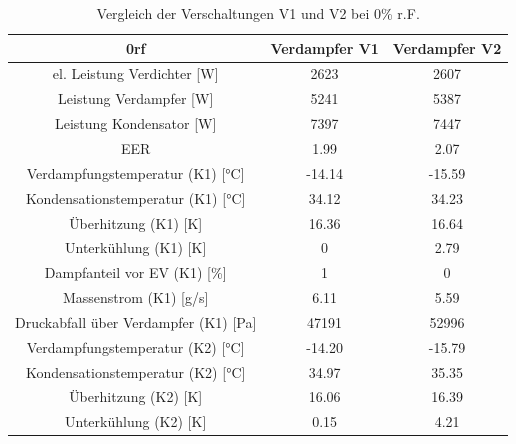 \begin{table}[h!]
\centering
\caption{Vergleich der Verschaltungen V1 und V2 bei 0\% r.F.}
\label{tab:VergleichV1V2_0rF}
\begin{tabular}{|ccc|}
\hline

0rf                                                             & Verdampfer V1               & Verdampfer V2 \\ \hline
\multicolumn{1}{|c|}{el. Leistung Verdichter {[}W{]}}           & \multicolumn{1}{c|}{2623}   & 2607          \\
\multicolumn{1}{|c|}{Leistung Verdampfer {[}W{]}}               & \multicolumn{1}{c|}{5241}   & 5387          \\
\multicolumn{1}{|c|}{Leistung Kondensator {[}W{]}}             & \multicolumn{1}{c|}{7397}   & 7447          \\
\multicolumn{1}{|c|}{EER}                                       & \multicolumn{1}{c|}{1.99}   & 2.07          \\ \hline
\multicolumn{1}{|c|}{Verdampfungstemperatur (K1) {[}°C{]}}      & \multicolumn{1}{c|}{-14.14} & -15.59        \\
\multicolumn{1}{|c|}{Kondensationstemperatur (K1) {[}°C{]}}    & \multicolumn{1}{c|}{34.12}  & 34.23         \\
\multicolumn{1}{|c|}{Überhitzung (K1) {[}K{]}}                  & \multicolumn{1}{c|}{16.36}  & 16.64         \\
\multicolumn{1}{|c|}{Unterkühlung (K1) {[}K{]}}                 & \multicolumn{1}{c|}{0}      & 2.79          \\
\multicolumn{1}{|c|}{Dampfanteil vor EV (K1) {[}\%{]}}          & \multicolumn{1}{c|}{1}      & 0             \\
\multicolumn{1}{|c|}{Massenstrom (K1) {[}g/s{]}}                & \multicolumn{1}{c|}{6.11}   & 5.59          \\
\multicolumn{1}{|c|}{Druckabfall über Verdampfer (K1) {[}Pa{]}} & \multicolumn{1}{c|}{47191}  & 52996         \\ \hline
\multicolumn{1}{|c|}{Verdampfungstemperatur (K2) {[}°C{]}}      & \multicolumn{1}{c|}{-14.20} & -15.79        \\
\multicolumn{1}{|c|}{Kondensationstemperatur (K2) {[}°C{]}}    & \multicolumn{1}{c|}{34.97}  & 35.35         \\
\multicolumn{1}{|c|}{Überhitzung (K2) {[}K{]}}                  & \multicolumn{1}{c|}{16.06}  & 16.39         \\
\multicolumn{1}{|c|}{Unterkühlung (K2) {[}K{]}}                 & \multicolumn{1}{c|}{0.15}   & 4.21          \\

\end{tabular}
\end{table}
